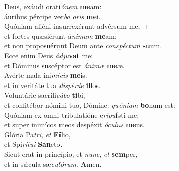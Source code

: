 \evenverse Deus, exáudi orati\textit{ó}\textit{nem} \textbf{me}am:~\*\\
\evenverse áuribus pércipe ver\textit{ba} \textit{o}\textit{ris} \textbf{me}i.\\
\oddverse Quóniam aliéni insurrexérunt advérsum me,~+\\
\oddverse  et fortes quæsiérunt á\textit{ni}\textit{mam} \textbf{me}am:~\*\\
\oddverse et non proposuérunt Deum ante \textit{con}\textit{spé}\textit{ctum} \textbf{su}um.\\
\evenverse Ecce enim Deus \textit{ád}\textit{ju}\textbf{vat} me:~\*\\
\evenverse et Dóminus suscéptor est \textit{á}\textit{ni}\textit{mæ} \textbf{me}æ.\\
\oddverse Avérte mala ini\textit{mí}\textit{cis} \textbf{me}is:~\*\\
\oddverse et in veritáte tua \textit{di}\textit{spér}\textit{de} \textbf{il}los.\\
\evenverse Voluntárie sacrifi\textit{cá}\textit{bo} \textbf{ti}bi,~\*\\
\evenverse et confitébor nómini tuo, Dómine: \textit{quó}\textit{ni}\textit{am} \textbf{bo}num est:\\
\oddverse Quóniam ex omni tribulatióne e\textit{ri}\textit{pu}\textbf{í}sti me:~\*\\
\oddverse et super inimícos meos despéxit \textit{ó}\textit{cu}\textit{lus} \textbf{me}us.\\
\evenverse Glória Pa\textit{tri}, \textit{et} \textbf{Fí}lio,~\*\\
\evenverse et Spi\textit{rí}\textit{tu}\textit{i} \textbf{San}cto.\\
\oddverse Sicut erat in princípio, et \textit{nunc}, \textit{et} \textbf{sem}per,~\*\\
\oddverse et in sǽcula sæ\textit{cu}\textit{ló}\textit{rum}. \textbf{A}men.\\
